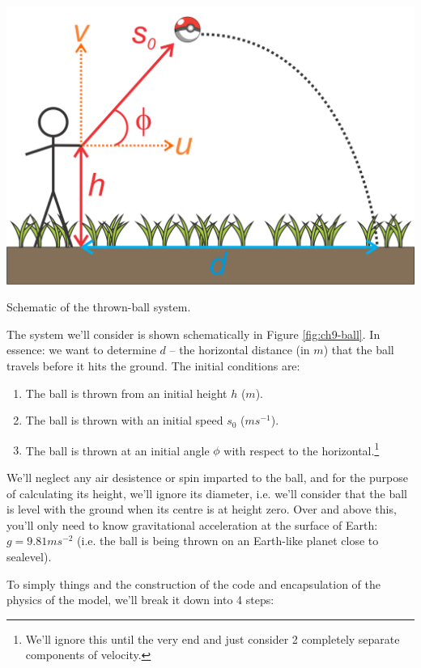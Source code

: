 \documentclass{tufte-book} %
\begin{document}
\begin{marginfigure}[0.0in]
\includegraphics[width=\linewidth]{ch9-ball.png}
\caption{Schematic of the thrown-ball system.}
\label{fig:ch9-ball}
\end{marginfigure}

The system we'll consider is shown schematically in Figure \ref{fig:ch9-ball}. In essence: we want to determine \(d\) -- the horizontal distance (in \(m\)) that the ball travels before it hits the ground. The initial conditions are:
\begin{enumerate}[noitemsep]
\setlength{\itemindent}{.2in}
\item The ball is thrown from an initial height \(h\) (\(m\)).
\item The ball is thrown with an initial speed \(s_{0}\) (\(ms^{-1}\)).
\item The ball is thrown at an initial angle \(\phi\) with respect to the horizontal.\footnote{We'll ignore this until the very end and just consider 2 completely separate components of velocity.} 
\end{enumerate}
We'll neglect any air desistence or spin imparted to the ball, and for the purpose of calculating its height, we'll ignore its diameter, i.e. we'll consider that the ball is level with the ground when its centre is at height zero. Over and above this, you'll only need to know  gravitational  acceleration at the surface of Earth: \(g=9.81 ms^{-2}\) (i.e. the ball is being thrown on an Earth-like planet close to sealevel).

To simply things and the construction of the code and encapsulation of the physics of the model, we'll break it down into 4 steps:
\end{document}
